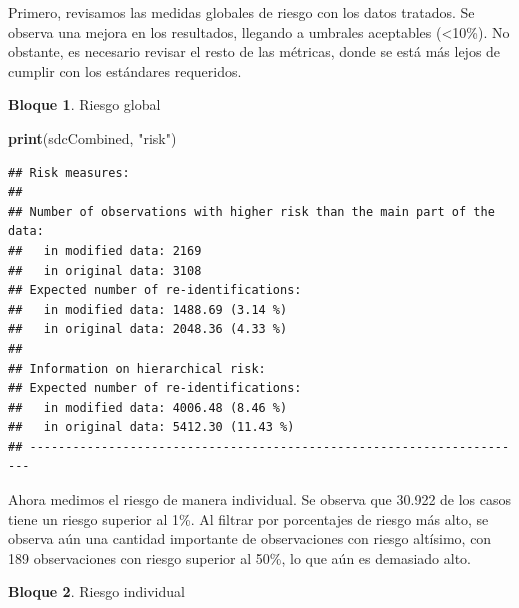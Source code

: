 \documentclass[]{book}
\newenvironment{Shaded}{\begin{snugshade}}{\end{snugshade}}
\newcommand{\CommentTok}[1]{\textcolor[rgb]{0.56,0.35,0.01}{\textit{#1}}}
\newcommand{\FloatTok}[1]{\textcolor[rgb]{0.00,0.00,0.81}{#1}}
\newcommand{\KeywordTok}[1]{\textcolor[rgb]{0.13,0.29,0.53}{\textbf{#1}}}
\newcommand{\NormalTok}[1]{#1}
\newcommand{\OperatorTok}[1]{\textcolor[rgb]{0.81,0.36,0.00}{\textbf{#1}}}
\newcommand{\StringTok}[1]{\textcolor[rgb]{0.31,0.60,0.02}{#1}}
\theoremstyle{definition}
\theoremstyle{definition}
\newtheorem{example}{Bloque}[chapter]
\theoremstyle{definition}
\theoremstyle{definition}
\theoremstyle{remark}
\begin{document}
Primero, revisamos las medidas globales de riesgo con los datos tratados. Se observa una mejora en los resultados, llegando a umbrales aceptables (\textless{}10\%). No obstante, es necesario revisar el resto de las métricas, donde se está más lejos de cumplir con los estándares requeridos.

\begin{example}
\protect\hypertarget{exm:bloque54nbm}{}{\label{exm:bloque54nbm} }Riesgo global
\end{example}

\begin{Shaded}
\begin{Highlighting}[]
\KeywordTok{print}\NormalTok{(sdcCombined, }\StringTok{"risk"}\NormalTok{)}
\end{Highlighting}
\end{Shaded}

\begin{verbatim}
## Risk measures:
## 
## Number of observations with higher risk than the main part of the data: 
##   in modified data: 2169
##   in original data: 3108
## Expected number of re-identifications: 
##   in modified data: 1488.69 (3.14 %)
##   in original data: 2048.36 (4.33 %)
## 
## Information on hierarchical risk:
## Expected number of re-identifications: 
##   in modified data: 4006.48 (8.46 %)
##   in original data: 5412.30 (11.43 %)
## ----------------------------------------------------------------------
\end{verbatim}

Ahora medimos el riesgo de manera individual. Se observa que 30.922 de los casos tiene un riesgo superior al 1\%. Al filtrar por porcentajes de riesgo más alto, se observa aún una cantidad importante de observaciones con riesgo altísimo, con 189 observaciones con riesgo superior al 50\%, lo que aún es demasiado alto.

\begin{example}
\protect\hypertarget{exm:bloque55nbm}{}{\label{exm:bloque55nbm} }Riesgo individual
\end{example}

\begin{Shaded}
\end{Shaded}
\end{document}
